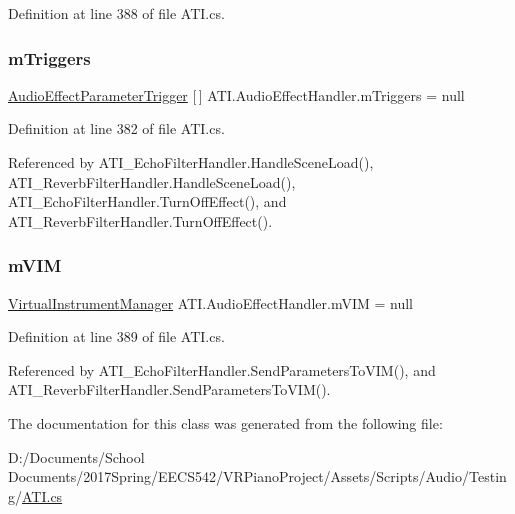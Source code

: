 Definition at line 388 of file A\+T\+I.\+cs.

\mbox{\label{class_a_t_i_1_1_audio_effect_handler_a1db04dc85daf07d045117d9bc585e944}} 
\subsubsection{\texorpdfstring{m\+Triggers}{mTriggers}}
{\footnotesize\ttfamily \hyperlink{class_a_t_i_1_1_audio_effect_parameter_trigger}{Audio\+Effect\+Parameter\+Trigger} \mbox{[}$\,$\mbox{]} A\+T\+I.\+Audio\+Effect\+Handler.\+m\+Triggers = null\hspace{0.3cm}{\ttfamily [protected]}}



Definition at line 382 of file A\+T\+I.\+cs.



Referenced by A\+T\+I\+\_\+\+Echo\+Filter\+Handler.\+Handle\+Scene\+Load(), A\+T\+I\+\_\+\+Reverb\+Filter\+Handler.\+Handle\+Scene\+Load(), A\+T\+I\+\_\+\+Echo\+Filter\+Handler.\+Turn\+Off\+Effect(), and A\+T\+I\+\_\+\+Reverb\+Filter\+Handler.\+Turn\+Off\+Effect().

\mbox{\label{class_a_t_i_1_1_audio_effect_handler_a6b5b6149cc376ff0f750ade08ba23bce}} 
\subsubsection{\texorpdfstring{m\+V\+IM}{mVIM}}
{\footnotesize\ttfamily \hyperlink{class_virtual_instrument_manager}{Virtual\+Instrument\+Manager} A\+T\+I.\+Audio\+Effect\+Handler.\+m\+V\+IM = null\hspace{0.3cm}{\ttfamily [protected]}}



Definition at line 389 of file A\+T\+I.\+cs.



Referenced by A\+T\+I\+\_\+\+Echo\+Filter\+Handler.\+Send\+Parameters\+To\+V\+I\+M(), and A\+T\+I\+\_\+\+Reverb\+Filter\+Handler.\+Send\+Parameters\+To\+V\+I\+M().



The documentation for this class was generated from the following file\+:\begin{DoxyCompactItemize}
\item 
D\+:/\+Documents/\+School Documents/2017\+Spring/\+E\+E\+C\+S542/\+V\+R\+Piano\+Project/\+Assets/\+Scripts/\+Audio/\+Testing/\hyperlink{_a_t_i_8cs}{A\+T\+I.\+cs}\end{DoxyCompactItemize}
